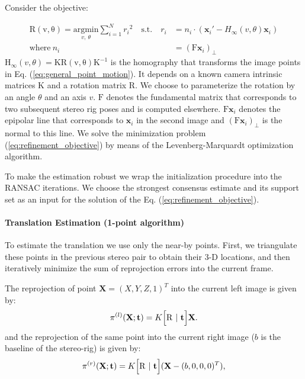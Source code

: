 Consider the objective:

\begin{equation}\label{eq:refinement_objective}
  \begin{split}
    \mathrm{R(v,\theta)} = \underset{v,\ \theta}{\mathrm{argmin}}
    \sum_{i=1}^N{r_i}^2\quad \text{s.t.}\quad r_i&=n_i\cdot (\mathbf{x}_i'-H_\infty(v,\theta)\mathbf{x}_i) \\
    \text{where}\ n_i &= (\mathrm{F}\mathbf{x}_i)_\perp
  \end{split}
\end{equation}
$\mathrm{H_\infty}(v,\theta) = \mathrm{KR(v,\theta)K^{-1}}$ is the
homography that transforms the image points in Eq.
(\ref{eq:general_point_motion}). It depends on a known camera
intrinsic matrices $\mathrm{K}$ and a rotation matrix $\mathrm{R}$.
We choose to parameterize the rotation by an angle $\theta$ and an
axis $v$.  $\mathrm{F}$ denotes the fundamental matrix that
corresponds to two subsequent stereo rig poses and is computed
elsewhere. $\mathrm{F}\mathbf{x}_i$ denotes the epipolar line that
corresponds to $\mathbf{x}_i$ in the second image and
$(\mathrm{F}\mathbf{x}_i)_\perp$ is the normal to this line.
We solve the minimization problem
(\ref{eq:refinement_objective}) by means of the Levenberg-Marquardt
optimization algorithm.

To make the estimation robust we wrap the initialization procedure
into the RANSAC iterations.  We choose the strongest consensus
estimate and its support set as an input for the solution of the
Eq. (\ref{eq:refinement_objective}).

\paragraph{Translation Estimation (1-point
  algorithm)}\label{sec:stereo_trans} To estimate
the translation we use only the near-by points.  First, we triangulate
these points in the previous stereo pair to obtain their 3-D
locations, and then iteratively minimize the sum of reprojection
errors into the current frame.

The reprojection of point $\mathbf{X}=(X,Y,Z,1)^T$ into the current
left image is given by:
\begin{equation}
  \pi^{(l)}(\mathbf{X};\mathbf{t}) =  K\Bigl[ \mathrm{R}\ |\ \mathbf{t} \Bigr]\mathbf{X}.
\end{equation}
and the reprojection of the same point into the current right image
($b$ is the baseline of the stereo-rig) is given by:
\begin{equation}
  \pi^{(r)}(\mathbf{X};\mathbf{t}) =  K\Bigl[ \mathrm{R}\ |\ \mathbf{t} \Bigr](\mathbf{X} - (b,0,0,0)^T),
\end{equation}

